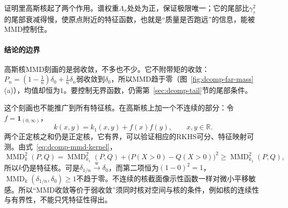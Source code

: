证明里高斯核起了两个作用。谱权重$\Lambda_\sigma$处处为正，保证极限唯一；它的尾部比$\gamma_\tau^{2}$的尾部衰减得慢，使原点附近的特征函数，也就是“质量是否跑远”的信息，能被MMD控制住。

\paragraph{结论的边界}
高斯核MMD刻画的是弱收敛，不多也不少。它不附带矩的收敛：$P_n=(1-\tfrac1n)\delta_0+\tfrac1n\delta_n$弱收敛到$\delta_0$，所以MMD趋于零（图~\ref{fig:dcomp-far-mass}(a)），均值却恒为$1$。要控制无界函数，仍需第~\ref{sec:dcomp-tail}节的尾部条件。

这个刻画也不能推广到所有特征核。在高斯核上加一个不连续的部分：令$f=\mathbf{1}_{(0,\infty)}$，
\[
 k(x,y)=k_1(x,y)+f(x)f(y),\qquad x,y\in\mathbb{R} .
\]
两个正定核之和仍是正定核，它有界，可以验证相应的RKHS可分、特征映射可测。由式~\eqref{eq:dcomp-mmd-kernel}，
\[
 \operatorname{MMD}_k^{2}(P,Q)=\operatorname{MMD}_{k_1}^{2}(P,Q)+\bigl(P(X>0)-Q(X>0)\bigr)^{2}\geq\operatorname{MMD}_{k_1}^{2}(P,Q),
\]
所以$k$仍是特征核。可是$\delta_{1/n}\xrightarrow{\mathrm{w}}\delta_0$，而第二项恒为$(1-0)^{2}=1$，$\operatorname{MMD}_k(\delta_{1/n},\delta_0)\geq1$不趋于零。不连续的核截面像示性函数一样对微小平移敏感。所以“MMD收敛等价于弱收敛”须同时核对空间与核的条件，例如核的连续性与有界性，不能只凭特征性得出。
